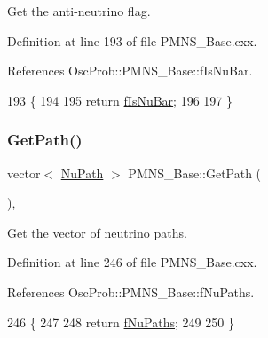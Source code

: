 Get the anti-\/neutrino flag. 

Definition at line 193 of file P\+M\+N\+S\+\_\+\+Base.\+cxx.



References Osc\+Prob\+::\+P\+M\+N\+S\+\_\+\+Base\+::f\+Is\+Nu\+Bar.


\begin{DoxyCode}
193                            \{
194 
195   \textcolor{keywordflow}{return} \hyperlink{classOscProb_1_1PMNS__Base_a0ebaeaefab36a3ff381c6293faedfdd6}{fIsNuBar};
196 
197 \}
\end{DoxyCode}
\mbox{\label{classOscProb_1_1PMNS__Base_ac8e196f2e85a2b1caaf705073ee95a5c}} 
\subsubsection{\texorpdfstring{Get\+Path()}{GetPath()}}
{\footnotesize\ttfamily vector$<$ \hyperlink{structOscProb_1_1NuPath}{Nu\+Path} $>$ P\+M\+N\+S\+\_\+\+Base\+::\+Get\+Path (\begin{DoxyParamCaption}{ }\end{DoxyParamCaption})\hspace{0.3cm}{\ttfamily [virtual]}, {\ttfamily [inherited]}}

Get the vector of neutrino paths. 

Definition at line 246 of file P\+M\+N\+S\+\_\+\+Base.\+cxx.



References Osc\+Prob\+::\+P\+M\+N\+S\+\_\+\+Base\+::f\+Nu\+Paths.


\begin{DoxyCode}
246                                  \{
247 
248   \textcolor{keywordflow}{return} \hyperlink{classOscProb_1_1PMNS__Base_a69db9d57e12fc7cbe0431bc6c18fac93}{fNuPaths};
249 
250 \}
\end{DoxyCode}
\mbox{\label{classOscProb_1_1PMNS__Base_a9eac8d768c1424755ee41f7e783af179}} 
